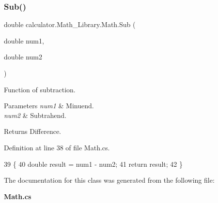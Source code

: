 \subsubsection{Sub()}
{\footnotesize\ttfamily double calculator.\+Math\+\_\+\+Library.\+Math.\+Sub (\begin{DoxyParamCaption}\item[{double}]{num1,  }\item[{double}]{num2 }\end{DoxyParamCaption})}



Function of subtraction. 


\begin{DoxyParams}{Parameters}
{\em num1} & Minuend.\\
\hline
{\em num2} & Subtrahend.\\
\hline
\end{DoxyParams}
\begin{DoxyReturn}{Returns}
Difference.
\end{DoxyReturn}


Definition at line 38 of file Math.\+cs.


\begin{DoxyCode}
39         \{
40             \textcolor{keywordtype}{double} result = num1 - num2;
41             \textcolor{keywordflow}{return} result;
42         \}
\end{DoxyCode}


The documentation for this class was generated from the following file\+:\begin{DoxyCompactItemize}
\item 
\textbf{ Math.\+cs}\end{DoxyCompactItemize}
